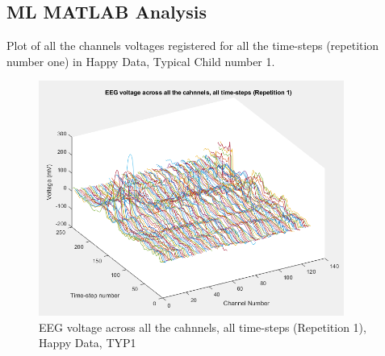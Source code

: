 \begin{appendices}



\clearpage
\section{ML MATLAB Analysis}

Plot of all the channels voltages registered for all the time-steps (repetition number one) in Happy Data, Typical Child number 1.

\setcounter{figure}{0}
\begin{figure}[ht!]%
    \centering
    \includegraphics[width=10cm]{images/series1}%
    \caption{EEG voltage across all the cahnnels, all time-steps (Repetition 1), Happy Data, TYP1}%
\end{figure}


\end{appendices}
